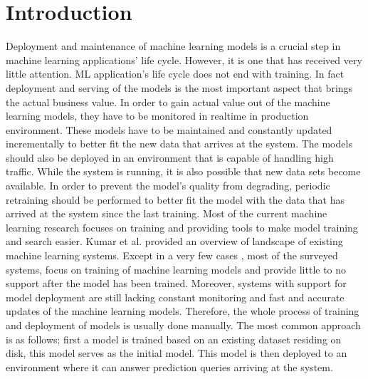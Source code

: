 \documentclass{vldb}
\begin{document}
\section{Introduction} \label{introduction}
Deployment and maintenance of machine learning models is a crucial step in machine learning applications' life cycle. 
However, it is one that has received very little attention. 
ML application's life cycle does not end with training. 
In fact deployment and serving of the models is the most important aspect that brings the actual business value. 
In order to gain actual value out of the machine learning models, they have to be monitored in realtime in production environment. 
These models have to be maintained and constantly updated incrementally to better fit the new data that arrives at the system. 
The models should also be deployed in an environment that is capable of handling high traffic. 
While the system is running, it is also possible that new data sets become available.
In order to prevent the model's quality from degrading, periodic retraining should be performed to better fit the model with the data that has arrived at the system since the last training.
Most of the current machine learning research focuses on training and providing tools to make model training and search easier. 
Kumar et al. \cite{kumar2015survey} provided an overview of landscape of existing machine learning systems. 
Except in a very few cases \cite{akdere2011case, crankshaw2014missing}, most of the surveyed systems, focus on training of machine learning models and provide little to no support after the model has been trained.
Moreover, systems with support for model deployment are still lacking constant monitoring and fast and accurate updates of the machine learning models.
Therefore, the whole process of training and deployment of models is usually done manually.
The most common approach is as follows; first a model is trained based on an existing dataset residing on disk, this model serves as the initial model.
This model is then deployed to an environment where it can answer prediction queries arriving at the system.
\end{document}
